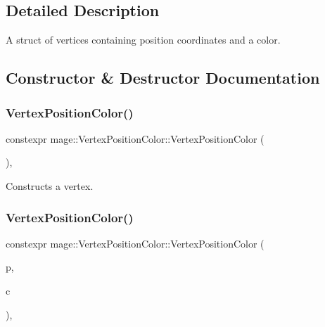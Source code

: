 \subsection{Detailed Description}
A struct of vertices containing position coordinates and a color. 

\subsection{Constructor \& Destructor Documentation}
\hypertarget{structmage_1_1_vertex_position_color_a1d9bbf97086b3006e9fdf5e70f75d4c7}{}\label{structmage_1_1_vertex_position_color_a1d9bbf97086b3006e9fdf5e70f75d4c7} 
\subsubsection{\texorpdfstring{Vertex\+Position\+Color()}{VertexPositionColor()}\hspace{0.1cm}{\footnotesize\ttfamily [1/4]}}
{\footnotesize\ttfamily constexpr mage\+::\+Vertex\+Position\+Color\+::\+Vertex\+Position\+Color (\begin{DoxyParamCaption}{ }\end{DoxyParamCaption})\hspace{0.3cm}{\ttfamily [default]}, {\ttfamily [noexcept]}}

Constructs a vertex. \hypertarget{structmage_1_1_vertex_position_color_a6ef8663606fb054b70c46557a7fe281b}{}\label{structmage_1_1_vertex_position_color_a6ef8663606fb054b70c46557a7fe281b} 
\subsubsection{\texorpdfstring{Vertex\+Position\+Color()}{VertexPositionColor()}\hspace{0.1cm}{\footnotesize\ttfamily [2/4]}}
{\footnotesize\ttfamily constexpr mage\+::\+Vertex\+Position\+Color\+::\+Vertex\+Position\+Color (\begin{DoxyParamCaption}\item[{const \hyperlink{structmage_1_1_point3}{Point3} \&}]{p,  }\item[{const \hyperlink{structmage_1_1_s_r_g_b_a}{S\+R\+G\+BA} \&}]{c }\end{DoxyParamCaption})\hspace{0.3cm}{\ttfamily [explicit]}, {\ttfamily [noexcept]}}

